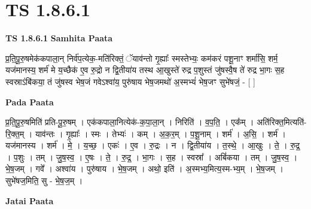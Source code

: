\documentclass[17pt]{extarticle}
\begin{document}
\section{ TS 1.8.6.1 }

\textbf{TS 1.8.6.1 } \newline
\textbf{Samhita Paata} \newline

प्र॒ति॒पू॒रु॒षमेक॑कपाला॒न् निर्व॑प॒त्येक॒-मति॑रिक्तं॒ ॅयाव॑न्तो गृ॒ह्याः᳚ स्मस्तेभ्यः॒ कम॑करं पशू॒नाꣳ शर्मा॑सि॒ शर्म॒ यज॑मानस्य॒ शर्म॑ मे य॒च्छैक॑ ए॒व रु॒द्रो न द्वि॒तीया॑य तस्थ आ॒खुस्ते॑ रुद्र प॒शुस्तं जु॑षस्वै॒ष ते॑ रुद्र भा॒गः स॒ह स्वस्राऽंबि॑कया॒ तं जु॑षस्व भेष॒जं गवेऽश्वा॑य॒ पुरु॑षाय भेष॒जमथो॑ अ॒स्मभ्यं॑ भेष॒जꣳ सुभे॑षजं॒ - [ ] \newline

\textbf{Pada Paata} \newline

प्र॒ति॒पू॒रु॒षमिति॑ प्रति-पू॒रु॒षम् । एक॑कपाला॒नित्येक॑-क॒पा॒ला॒न् । निरिति॑ । व॒प॒ति॒ । एक᳚म् । अति॑रिक्त॒मित्यति॑-रि॒क्त॒म् । याव॑न्तः । गृ॒ह्याः᳚ । स्मः । तेभ्यः॑ । कम् । अ॒क॒र॒म् । प॒शू॒नाम् । शर्म॑ । अ॒सि॒ । शर्म॑ । यज॑मानस्य । शर्म॑ । मे॒ । य॒च्छ॒ । एकः॑ । ए॒व । रु॒द्रः । न । द्वि॒तीया॑य । त॒स्थे॒ । आ॒खुः । ते॒ । रु॒द्र॒ । प॒शुः । तम् । जु॒ष॒स्व॒ । ए॒षः । ते॒ । रु॒द्र॒ । भा॒गः । स॒ह । स्वस्रा᳚ । अबिं॑कया । तम् । जु॒ष॒स्व॒ । भे॒ष॒जम् । गवे᳚ । अश्वा॑य । पुरु॑षाय । भे॒ष॒जम् । अथो॒ इति॑ । अ॒स्मभ्य॒मित्य॒स्म-भ्य॒म् । भे॒ष॒जम् । सुभे॑षज॒मिति॒ सु - भे॒ष॒ज॒म् ।  \newline



\textbf{Jatai Paata} \newline
\end{document}
